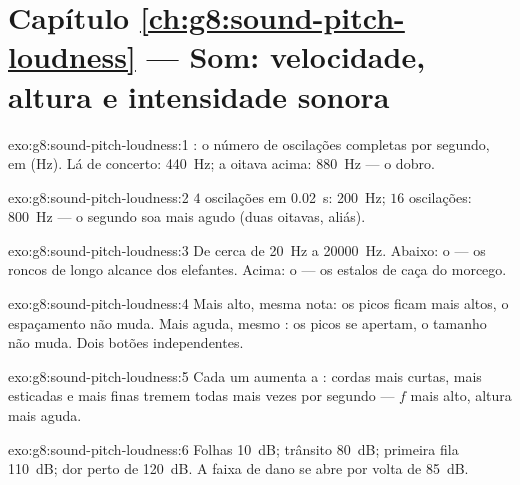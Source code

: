 \section*{Capítulo \ref{ch:g8:sound-pitch-loudness} --- Som: velocidade, altura e intensidade sonora}

\begin{solution}{exo:g8:sound-pitch-loudness:1}
: o número de oscilações completas por segundo, em 
(\unit{Hz}). Lá de concerto: \qty{440}{Hz}; a oitava acima:
\qty{880}{Hz} --- o dobro.
\end{solution}

\begin{solution}{exo:g8:sound-pitch-loudness:2}
$4$ oscilações em \qty{0.02}{s}: \qty{200}{Hz}; $16$ oscilações:
\qty{800}{Hz} --- o segundo soa mais agudo (duas oitavas, aliás).
\end{solution}

\begin{solution}{exo:g8:sound-pitch-loudness:3}
De cerca de \qty{20}{Hz} a \qty{20000}{Hz}. Abaixo: o  ---
os roncos de longo alcance dos elefantes. Acima: o  --- os
estalos de caça do morcego.
\end{solution}

\begin{solution}{exo:g8:sound-pitch-loudness:4}
Mais alto, mesma nota: os picos ficam mais altos, o espaçamento não
muda. Mais aguda, mesmo : os picos se apertam, o tamanho não
muda. Dois botões independentes.
\end{solution}

\begin{solution}{exo:g8:sound-pitch-loudness:5}
Cada um aumenta a : cordas mais curtas, mais esticadas e
mais finas tremem todas mais vezes por segundo --- $f$ mais alto,
altura mais aguda.
\end{solution}

\begin{solution}{exo:g8:sound-pitch-loudness:6}
Folhas \qty{10}{dB}; trânsito \qty{80}{dB}; primeira fila
\qty{110}{dB}; dor perto de \qty{120}{dB}. A faixa de dano se abre
por volta de \qty{85}{dB}.
\end{solution}

